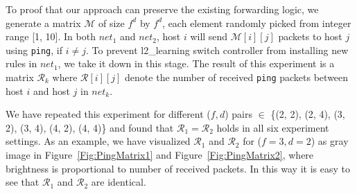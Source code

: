 To proof that our approach can preserve the existing forwarding logic,
we generate a matrix $\mathcal{M}$ of size $f^d$ by $f^d$, each element randomly picked
from integer range [1, 10].
In both $net_1$ and $net_2$, host $i$ will send $\mathcal{M}[i][j]$ packets to host $j$
using \texttt{ping}, if $i \neq j$.
To prevent l2\_learning switch controller from installing new rules in $net_1$, we take it down
in this stage.
The result of this experiment is a matrix $\mathcal{R}_k$ where $\mathcal{R}[i][j]$ denote
the number of received \texttt{ping} packets between host $i$ and host $j$ in $net_k$.

We have repeated this experiment for different ($f, d$) pairs $\in$
\{(2, 2), (2, 4), (3, 2), (3, 4), (4, 2), (4, 4)\} and found that $\mathcal{R}_1 = \mathcal{R}_2$
holds in all six experiment settings.
As an example, we have visualized $\mathcal{R}_1$ and $\mathcal{R}_2$ for ($f=3, d=2$) as gray image
in Figure~\ref{Fig:PingMatrix1} and Figure~\ref{Fig:PingMatrix2},
where brightness is proportional to number of received packets.
In this way it is easy to see that $\mathcal{R}_1$ and $\mathcal{R}_2$ are identical.

